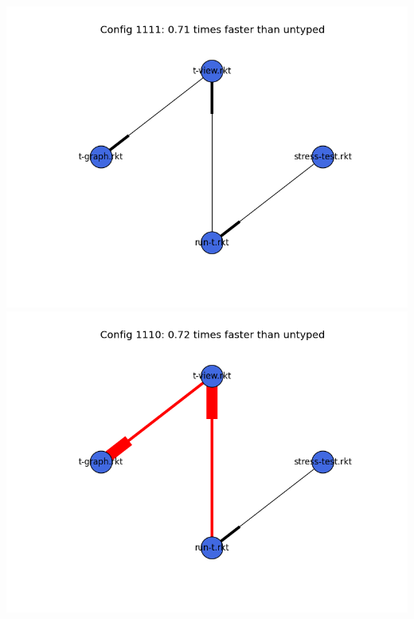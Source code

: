 \documentclass{article}
\begin{document}
\begin{itemize}
\includegraphics[width=\textwidth]{mbta-ben-module-graph-1111.png}
\includegraphics[width=\textwidth]{mbta-ben-module-graph-1110.png}
\end{itemize}
\end{document}
